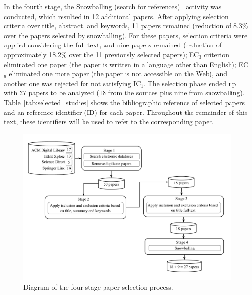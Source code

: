 In the fourth stage, the Snowballing (search for references)~\cite{Kitchenham:2007} activity was conducted, which resulted in 12 additional papers. After applying selection criteria over title, abstract, and keywords, 11 papers remained (reduction of 8.3\% over the papers selected by snowballing). For these papers, selection criteria were applied considering the full text, and nine papers remained (reduction of approximately 18.2\% over the 11 previously selected papers); EC$_{3}$ criterion eliminated one paper (the paper is  written in a language other than English); EC$_{6}$ eliminated one more paper (the paper is not accessible on the Web), and another one  was rejected for not satisfying IC$_{1}$. The selection phase ended up with 27 papers to be analyzed (18 from the sources plus nine from snowballing). Table~\ref{tab:selected_studies} shows the bibliographic reference of selected papers and an reference identifier (ID) for each paper. Throughout the remainder of this text, these identifiers will be used to refer to the corresponding paper.

\begin{figure}[h!]
  \centering
  \includegraphics[width=.9\textwidth]{figures/smr-selection-phases.pdf}
  \caption{Diagram of the four-stage paper selection process.}
  \label{fig:smr_selection_phases}
\end{figure}

